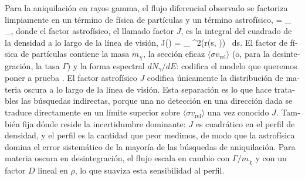\begin{otherlanguage}{spanish}
Para la aniquilación en rayos gamma, el flujo diferencial observado se factoriza limpiamente en un término de física de partículas y un término astrofísico,
\be
{} = _{} \quad \times {}_{},
\ee
donde el factor astrofísico, el llamado factor $J$, es la integral del cuadrado de la densidad a lo largo de la línea de visión,
\be
J(\psi) = \int_ \rho^2\bigl(r(s, \psi)\bigr) \, ds.
\ee
El factor de física de partículas contiene la masa $m_\chi$, la sección eficaz $\langle \sigma v_\mathrm{rel}\rangle$ (o, para la desintegración, la tasa $\Gamma$) y la forma espectral $dN_\gamma/dE$: codifica el modelo que queremos poner a prueba \cite{Cirelli:2024ssz, Hooper:2024}. El factor astrofísico $J$ codifica únicamente la distribución de materia oscura a lo largo de la línea de visión. Esta separación es lo que hace tratables las búsquedas indirectas, porque una no detección en una dirección dada se traduce directamente en un límite superior sobre $\langle \sigma v_\mathrm{rel}\rangle$ una vez conocido $J$. También fija dónde reside la incertidumbre dominante: $J$ es cuadrático en el perfil de densidad, y el perfil es la cantidad que peor medimos, de modo que la astrofísica domina el error sistemático de la mayoría de las búsquedas de aniquilación. Para materia oscura en desintegración, el flujo escala en cambio con $\Gamma/m_\chi$ y con un factor $D$ lineal en $\rho$, lo que suaviza esta sensibilidad al perfil.


\end{otherlanguage}

